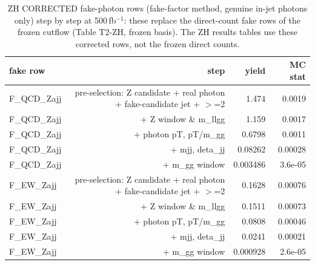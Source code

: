 \begin{table}[ht]\centering\small
\begin{tabular}{lrrr}\hline
fake row & step & yield & MC stat \\\hline
F\_QCD\_Zajj & pre-selection: Z candidate + real photon + fake-candidate jet + $>$=2  & 1.474 & 0.0019 \\
F\_QCD\_Zajj & + Z window \& m\_llgg & 1.159 & 0.0017 \\
F\_QCD\_Zajj & + photon pT, pT/m\_gg & 0.6798 & 0.0011 \\
F\_QCD\_Zajj & + mjj, deta\_jj & 0.08262 & 0.00028 \\
F\_QCD\_Zajj & + m\_gg window & 0.003486 & 3.6e-05 \\
F\_EW\_Zajj & pre-selection: Z candidate + real photon + fake-candidate jet + $>$=2  & 0.1628 & 0.00076 \\
F\_EW\_Zajj & + Z window \& m\_llgg & 0.1511 & 0.00073 \\
F\_EW\_Zajj & + photon pT, pT/m\_gg & 0.0808 & 0.00046 \\
F\_EW\_Zajj & + mjj, deta\_jj & 0.0241 & 0.00021 \\
F\_EW\_Zajj & + m\_gg window & 0.000928 & 2.6e-05 \\\hline
\end{tabular}
\caption{ZH CORRECTED fake-photon rows (fake-factor method, genuine in-jet photons only) step by step at 500\,fb$^{-1}$: these replace the direct-count fake rows of the frozen cutflow (Table T2-ZH, frozen basis). The ZH results tables use these corrected rows, not the frozen direct counts.}
\end{table}
